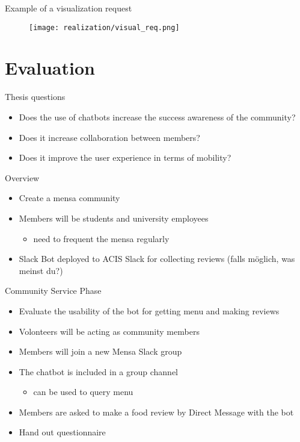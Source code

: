 \begin{frame}{Example of a visualization request}
  \begin{figure}
    \centering
    \texttt{[image: realization/visual\_req.png]}

    \label{fig:visualReq}
  \end{figure}
\end{frame}

\section{Evaluation}

\begin{frame}{Thesis questions}
  \begin{itemize}
    \item Does the use of chatbots increase the success awareness of the community?
    \item Does it increase collaboration between members?
    \item Does it improve the user experience in terms of mobility?
  \end{itemize}
\end{frame}

\begin{frame}{Overview}
  \begin{itemize}
    \item Create a mensa community
    \item Members will be students and university employees
          \begin{itemize}
            \item need to frequent the mensa regularly %
          \end{itemize}
    \item Slack Bot deployed to ACIS Slack for collecting reviews (falls möglich, was meinst du?)
  \end{itemize}
\end{frame}

\begin{frame}{Community Service Phase}
  \begin{itemize}
    \item Evaluate the usability of the bot for getting menu and making reviews
    \item Volonteers will be acting as community members
    \item Members will join a new Mensa Slack group
    \item The chatbot is included in a group channel
          \begin{itemize}
            \item can be used to query menu
          \end{itemize}
    \item Members are asked to make a food review by Direct Message with the bot
    \item Hand out questionnaire
  \end{itemize}
\end{frame}

